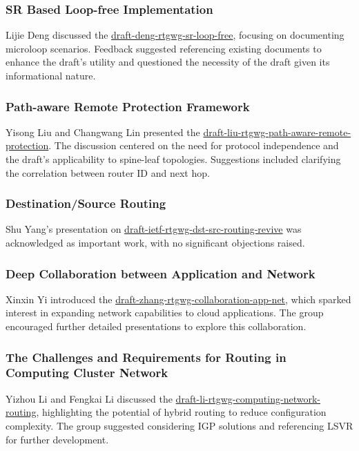 \documentclass{article}
\begin{document}
\subsubsection{SR Based Loop-free Implementation}
Lijie Deng discussed the \href{https://datatracker.ietf.org/doc/html/draft-deng-rtgwg-sr-loop-free}{draft-deng-rtgwg-sr-loop-free}, focusing on documenting microloop scenarios. Feedback suggested referencing existing documents to enhance the draft's utility and questioned the necessity of the draft given its informational nature.

\subsubsection{Path-aware Remote Protection Framework}
Yisong Liu and Changwang Lin presented the \href{https://datatracker.ietf.org/doc/html/draft-liu-rtgwg-path-aware-remote-protection}{draft-liu-rtgwg-path-aware-remote-protection}. The discussion centered on the need for protocol independence and the draft's applicability to spine-leaf topologies. Suggestions included clarifying the correlation between router ID and next hop.

\subsubsection{Destination/Source Routing}
Shu Yang's presentation on \href{https://datatracker.ietf.org/doc/html/draft-ietf-rtgwg-dst-src-routing-revive}{draft-ietf-rtgwg-dst-src-routing-revive} was acknowledged as important work, with no significant objections raised.

\subsubsection{Deep Collaboration between Application and Network}
Xinxin Yi introduced the \href{https://datatracker.ietf.org/doc/html/draft-zhang-rtgwg-collaboration-app-net}{draft-zhang-rtgwg-collaboration-app-net}, which sparked interest in expanding network capabilities to cloud applications. The group encouraged further detailed presentations to explore this collaboration.

\subsubsection{The Challenges and Requirements for Routing in Computing Cluster Network}
Yizhou Li and Fengkai Li discussed the \href{https://datatracker.ietf.org/doc/html/draft-li-rtgwg-computing-network-routing}{draft-li-rtgwg-computing-network-routing}, highlighting the potential of hybrid routing to reduce configuration complexity. The group suggested considering IGP solutions and referencing LSVR for further development.
\end{document}

